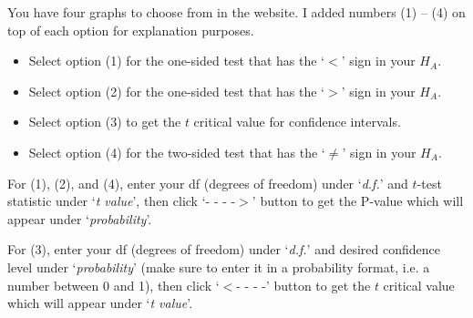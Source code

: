 \documentclass[12pt]{article}
\begin{document}
You have four graphs to choose from in the website. I added numbers (1) -- (4) on top of each option for explanation purposes.
\begin{itemize}
	\item Select option (1) for the one-sided test that has the `$<$' sign in your $H_A$.
	\item Select option (2) for the one-sided test that has the `$>$' sign in your $H_A$.
	\item Select option (3) to get the $t$ critical value for confidence intervals.
	\item Select option (4) for the two-sided test that has the `$\neq$' sign in your $H_A$.
\end{itemize}

For (1), (2), and (4), enter your df (degrees of freedom) under `\textit{d.f.}' and $t$-test statistic under `\textit{t value}', then click `- - - -$>$' button to get the P-value which will appear under `\textit{probability}'.

For (3), enter your df (degrees of freedom) under `\textit{d.f.}' and desired confidence level under `\textit{probability}' (make sure to enter it in a probability format, i.e. a number between 0 and 1), then click `$<$- - - -' button to get the $t$ critical value which will appear under `\textit{t value}'.
\end{document}
